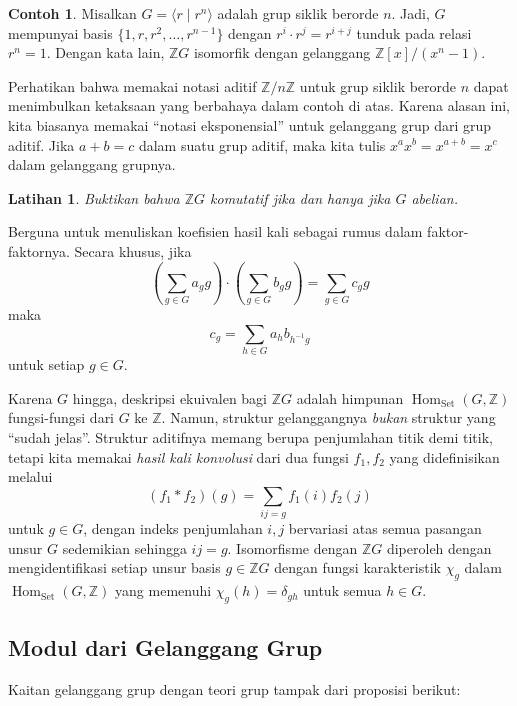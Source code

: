 \documentclass[12pt]{article}
\theoremstyle{plain}
\newtheorem{exercise}[theorem]{Latihan}
\theoremstyle{definition}
\newtheorem{example}[theorem]{Contoh}
\theoremstyle{remark}
\numberwithin{equation}{section}
\begin{document}
\begin{example}
Misalkan $G = \langle r \mid r^n \rangle$ adalah grup siklik berorde $n$.
Jadi, $G$ mempunyai basis $\{1,r,r^2,\ldots, r^{n-1} \}$
dengan $r^i\cdot r^j=r^{i+j}$ tunduk pada relasi $r^n=1$.
Dengan kata lain, $\mathbb{Z}G$ isomorfik dengan gelanggang
$\mathbb{Z}[x]/(x^n-1)$.
\end{example}

Perhatikan bahwa memakai notasi aditif $\mathbb{Z}/n\mathbb{Z}$
untuk grup siklik berorde $n$ dapat menimbulkan ketaksaan
yang berbahaya dalam contoh di atas.
Karena alasan ini, kita biasanya memakai “notasi eksponensial”
untuk gelanggang grup dari grup aditif.
Jika $a+b=c$ dalam suatu grup aditif, maka
kita tulis $x^ax^b=x^{a+b}=x^c$ dalam gelanggang grupnya.

\begin{exercise}
Buktikan bahwa $\mathbb{Z}G$ komutatif jika dan hanya jika $G$ abelian.
\end{exercise}

Berguna untuk menuliskan koefisien hasil kali sebagai rumus dalam
faktor-faktornya. Secara khusus, jika
\[
\left( \sum_{g \in G} a_g g \right) \cdot
\left( \sum_{g \in G} b_g g \right)
= \sum_{g \in G} c_g g
\]
maka
\[
c_g = \sum_{h \in G} a_hb_{h^{-1}g}
\]
untuk setiap $g \in G$.

Karena $G$ hingga, deskripsi ekuivalen bagi $\mathbb{Z}G$ adalah himpunan
$\operatorname{Hom}_{\mathrm{Set}}(G,\mathbb{Z})$
fungsi-fungsi dari $G$ ke $\mathbb{Z}$.
Namun, struktur gelanggangnya \emph{bukan} struktur yang “sudah jelas”.
Struktur aditifnya memang berupa penjumlahan titik demi titik,
tetapi kita memakai \emph{hasil kali konvolusi}
dari dua fungsi $f_1,f_2$ yang didefinisikan melalui
\[
(f_1 \ast f_2)(g) = \sum_{ij=g} f_1(i)f_2(j)
\]
untuk $g \in G$, dengan indeks penjumlahan $i,j$
bervariasi atas semua pasangan unsur $G$ sedemikian sehingga $ij=g$.
Isomorfisme dengan $\mathbb{Z}G$ diperoleh dengan mengidentifikasi setiap unsur basis
$g \in \mathbb{Z}G$ dengan fungsi karakteristik $\chi_g$
dalam $\operatorname{Hom}_{\mathrm{Set}}(G,\mathbb{Z})$
yang memenuhi $\chi_g(h) = \delta_{gh}$ untuk semua $h \in G$.

\subsection{Modul dari Gelanggang Grup}

Kaitan gelanggang grup dengan teori grup tampak dari
proposisi berikut:
\end{document}
